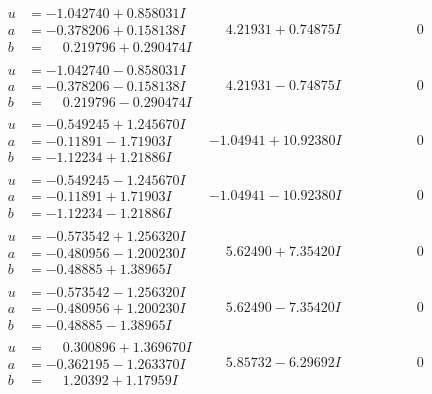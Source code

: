 \documentclass[1p]{elsarticle_modified}
\theoremstyle{definition}
\begin{document}
$$\begin{array}{c|c|c}
\begin{aligned}
u &= -1.042740 + 0.858031 I \\
a &= -0.378206 + 0.158138 I \\
b &= \phantom{-}0.219796 + 0.290474 I\end{aligned}
 & \phantom{-}4.21931 + 0.74875 I & \phantom{-0.000000 } 0 \\ \hline\begin{aligned}
u &= -1.042740 - 0.858031 I \\
a &= -0.378206 - 0.158138 I \\
b &= \phantom{-}0.219796 - 0.290474 I\end{aligned}
 & \phantom{-}4.21931 - 0.74875 I & \phantom{-0.000000 } 0 \\ \hline\begin{aligned}
u &= -0.549245 + 1.245670 I \\
a &= -0.11891 - 1.71903 I \\
b &= -1.12234 + 1.21886 I\end{aligned}
 & -1.04941 + 10.92380 I & \phantom{-0.000000 } 0 \\ \hline\begin{aligned}
u &= -0.549245 - 1.245670 I \\
a &= -0.11891 + 1.71903 I \\
b &= -1.12234 - 1.21886 I\end{aligned}
 & -1.04941 - 10.92380 I & \phantom{-0.000000 } 0 \\ \hline\begin{aligned}
u &= -0.573542 + 1.256320 I \\
a &= -0.480956 - 1.200230 I \\
b &= -0.48885 + 1.38965 I\end{aligned}
 & \phantom{-}5.62490 + 7.35420 I & \phantom{-0.000000 } 0 \\ \hline\begin{aligned}
u &= -0.573542 - 1.256320 I \\
a &= -0.480956 + 1.200230 I \\
b &= -0.48885 - 1.38965 I\end{aligned}
 & \phantom{-}5.62490 - 7.35420 I & \phantom{-0.000000 } 0 \\ \hline\begin{aligned}
u &= \phantom{-}0.300896 + 1.369670 I \\
a &= -0.362195 - 1.263370 I \\
b &= \phantom{-}1.20392 + 1.17959 I\end{aligned}
 & \phantom{-}5.85732 - 6.29692 I & \phantom{-0.000000 } 0 \\ \hline\begin{aligned}

\end{aligned}
\end{array}$$
\end{document}
